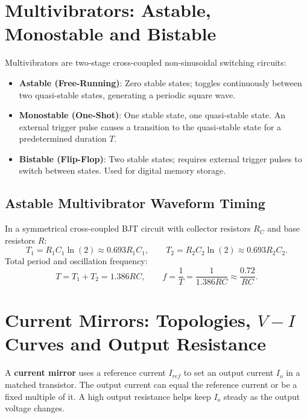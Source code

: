 \documentclass[12pt,a4paper]{article}
\begin{document}
\section{Multivibrators: Astable, Monostable and Bistable}

\begin{tcolorbox}[defbox, title={Multivibrator Classification}]
Multivibrators are two-stage cross-coupled non-sinusoidal switching circuits:
\begin{itemize}[leftmargin=1.5em, itemsep=2pt]
  \item \textbf{Astable (Free-Running)}: Zero stable states; toggles continuously between two quasi-stable states, generating a periodic square wave.
  \item \textbf{Monostable (One-Shot)}: One stable state, one quasi-stable state. An external trigger pulse causes a transition to the quasi-stable state for a predetermined duration $T$.
  \item \textbf{Bistable (Flip-Flop)}: Two stable states; requires external trigger pulses to switch between states. Used for digital memory storage.
\end{itemize}
\end{tcolorbox}

\subsection{Astable Multivibrator Waveform Timing}
In a symmetrical cross-coupled BJT circuit with collector resistors $R_C$ and base resistors $R$:
\[
T_1 = R_1 C_1 \ln(2) \approx 0.693 R_1 C_1,\qquad
T_2 = R_2 C_2 \ln(2) \approx 0.693 R_2 C_2.
\]
Total period and oscillation frequency:
\[
T = T_1 + T_2 = 1.386 RC,\qquad f = \frac{1}{T} = \frac{1}{1.386 RC} \approx \frac{0.72}{RC}.
\]

\section{Current Mirrors: Topologies, $V-I$ Curves and Output Resistance}

\begin{tcolorbox}[defbox, title={Current Mirror Concept}]
A \textbf{current mirror} uses a reference current $I_{ref}$ to set an output current $I_o$ in a matched transistor. The output current can equal the reference current or be a fixed multiple of it. A high output resistance helps keep $I_o$ steady as the output voltage changes.
\end{tcolorbox}
\end{document}
